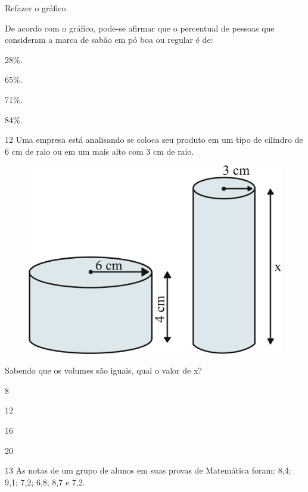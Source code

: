 Refazer o gráfico

De acordo com o gráfico, pode-se afirmar que o percentual de pessoas que
consideram a marca de sabão em pó boa ou regular é de:

\begin{escolha}
\item 28\%.

\item 65\%.

\item 71\%.

\item 84\%.
\end{escolha}

\pagebreak
\num{12} Uma empresa está analisando se coloca seu produto em um tipo de
cilindro de 6 cm de raio ou em um mais alto com 3 cm de raio.

\begin{figure}[htpb!]
\centering
\includegraphics[width=\textwidth]{./ilustras-mat/Simulado_4-atividade_12.png}
\end{figure}

Sabendo que os volumes são iguais, qual o valor de x?

\begin{escolha}
\item
  8
\item
  12
\item
  16
\item
  20
\end{escolha}

\pagebreak
\num{13} As notas de um grupo de alunos em suas provas de Matemática foram:
8,4; 9,1; 7,2; 6,8; 8,7 e 7,2.

